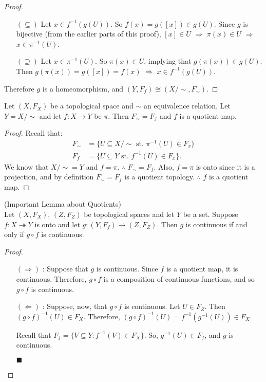 \begin{proof}
\begin{itemize}
\begin{itemize}
	\item[$(\subseteq)$] Let $x \in f^{-1}(g(U))$. So $f(x)=g([x]) \in g(U)$. Since $g$ is bijective (from the earlier parts of this proof), $[x] \in U$ $\Rightarrow$ $\pi(x) \in U$ $\Rightarrow$ $x \in \pi^{-1}(U)$. 
	\item[$(\supseteq)$] Let $x \in \pi^{-1}(U)$. So $\pi(x) \in U$, implying that $g(\pi(x)) \in g(U)$. Then $g(\pi(x)) = g([x]) = f(x)$ $\Rightarrow$ $x \in f^{-1}(g(U))$. 
\end{itemize}
\end{itemize}
Therefore $g$ is a homeomorphism, and $(Y,F_f) \cong (X/\sim,F_\sim)$. 
\end{proof}
\begin{theorem}
Let $(X,F_X)$ be a topological space and $\sim$ an equivalence relation. Let $Y = X/\sim$ and let $f : X \rightarrow Y$ be $\pi$. Then $F_\sim = F_f$ and $f$ is a quotient map. 
\end{theorem}
\begin{proof}
Recall that: 
\begin{align*}
F_\sim &= \{ U \subseteq X/\sim \text{ st. } \pi^{-1} (U) \in F_x \} \\
F_f &= \{ U \subseteq Y \text{ st. } f^{-1} (U) \in F_x \}. 
\end{align*}
We know that $X/\sim = Y$ and $f = \pi$. $\therefore$ $F_\sim = F_f$. Also, $f = \pi$ is onto since it is a projection, and by definition $F_\sim = F_f$ is a quotient topology. $\therefore$ $f$ is a quotient map. 
\end{proof}
\begin{lemma}
(Important Lemma about Quotients)\\
Let $(X,F_X)$, $(Z,F_Z)$ be topological spaces and let $Y$ be a set. Suppose $f: X \twoheadrightarrow Y$ is onto and let $g: (Y,F_f) \rightarrow (Z,F_Z)$. Then $g$ is continuous if and only if $g \circ f$ is continuous. 
\end{lemma}
\begin{proof}
\begin{itemize}
\item[$(\Rightarrow)$]: Suppose that $g$ is continuous. Since $f$ is a quotient map, it is continuous. Therefore, $g\circ f$ is a composition of continuous functions, and so $g\circ f$ is continuous.

\item[$(\Leftarrow)$]: Suppose, now, that $g\circ f$ is continuous. Let $U\in F_Z$. Then $(g\circ f)^{-1}(U)\in F_X$. Therefore, $(g\circ f)^{-1}(U) = f^{-1}(g^{-1}(U)) \in F_X$.

Recall that $F_f = \{ V\subseteq Y : f^{-1}(V)\in F_X\}$. So, $g^{-1}(U) \in F_f$, and $g$ is continuous. 
\begin{flushright}
	$\blacksquare$
\end{flushright}
\end{itemize}
\end{proof}
